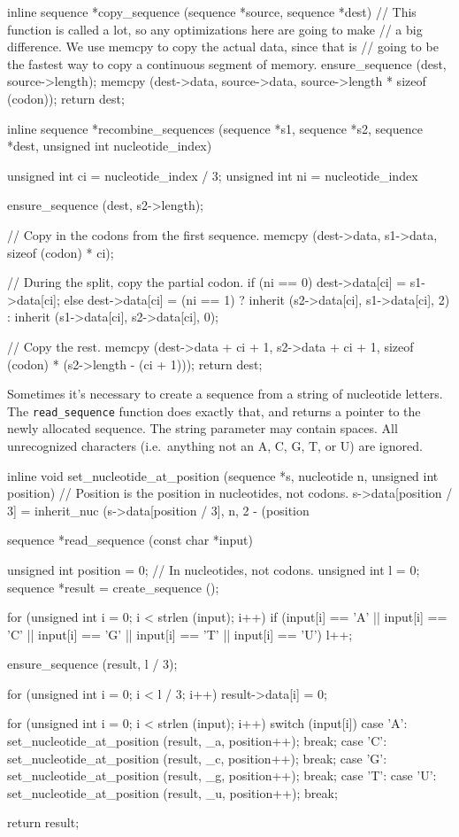 \documentclass{article}
\begin{document}
\begin{ccode}
inline sequence *copy_sequence (sequence *source, sequence *dest) {
  // This function is called a lot, so any optimizations here are going to make
  // a big difference. We use memcpy to copy the actual data, since that is
  // going to be the fastest way to copy a continuous segment of memory.
  ensure_sequence (dest, source->length);
  memcpy (dest->data, source->data, source->length * sizeof (codon));
  return dest;
}

inline sequence *recombine_sequences (sequence *s1, sequence *s2, sequence *dest,
				      unsigned int nucleotide_index) {
  unsigned int ci = nucleotide_index / 3;
  unsigned int ni = nucleotide_index %

  ensure_sequence (dest, s2->length);

  // Copy in the codons from the first sequence.
  memcpy (dest->data, s1->data, sizeof (codon) * ci);

  // During the split, copy the partial codon.
  if (ni == 0)
    dest->data[ci] = s1->data[ci];
  else
    dest->data[ci] = (ni == 1) ? inherit (s2->data[ci], s1->data[ci], 2) :
				 inherit (s1->data[ci], s2->data[ci], 0);

  // Copy the rest.
  memcpy (dest->data + ci + 1, s2->data + ci + 1, sizeof (codon) * (s2->length - (ci + 1)));
  return dest;
}
\end{ccode}

      Sometimes it's necessary to create a sequence from a string of nucleotide
      letters. The \verb|read_sequence| function does exactly that, and returns a
      pointer to the newly allocated sequence. The string parameter may contain
      spaces. All unrecognized characters (i.e.\ anything not an A, C, G, T, or
	  U) are ignored.

\begin{ccode}
inline void set_nucleotide_at_position (sequence *s, nucleotide n, unsigned int position) {
  // Position is the position in nucleotides, not codons.
  s->data[position / 3] = inherit_nuc (s->data[position / 3], n, 2 - (position %
}

sequence *read_sequence (const char *input) {
  unsigned int position = 0; // In nucleotides, not codons.
  unsigned int l   	= 0;
  sequence *result 	= create_sequence ();

  for (unsigned int i = 0; i < strlen (input); i++)
    if (input[i] == 'A' || input[i] == 'C' || input[i] == 'G' ||
	input[i] == 'T' || input[i] == 'U')
      l++;

  ensure_sequence (result, l / 3);

  for (unsigned int i = 0; i < l / 3; i++)
    result->data[i] = 0;

  for (unsigned int i = 0; i < strlen (input); i++)
    switch (input[i]) {
      case 'A': set_nucleotide_at_position (result, _a, position++); break;
      case 'C': set_nucleotide_at_position (result, _c, position++); break;
      case 'G': set_nucleotide_at_position (result, _g, position++); break;
      case 'T':
      case 'U': set_nucleotide_at_position (result, _u, position++); break;
    }

  return result;
}
\end{ccode}
\end{document}
